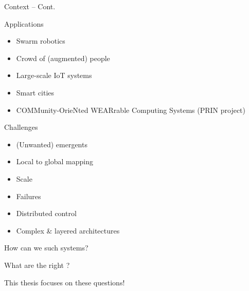 \documentclass[presentation, 9pt,169]{beamer}\mode<presentation>{\usetheme{AMSBolognaFC}}
\begin{document}
\begin{frame}{Context -- Cont.}
\begin{alertblock}{Applications}
  \begin{multicols}{3}
    \begin{itemize}
      \item Swarm robotics
      \item Crowd of (augmented) people
      \item Large-scale IoT systems
      \item Smart cities
      \item COMMunity-OrieNted WEARrable Computing Systems (PRIN project)
    \end{itemize}
  \end{multicols}
\end{alertblock}

\begin{block}{Challenges}
  \begin{multicols}{3}
    \begin{itemize}
      \item (Unwanted) emergents
      \item Local to global mapping
      \item Scale
      \item Failures
      \item Distributed control
      \item Complex \& layered architectures
    \end{itemize}
  \end{multicols}
\end{block}
\begin{center}
  \Large{How can we  such systems?}
  \end{center}
  \begin{center}
    \Large{What are the right ?}
  \end{center}
  \begin{center}
    \Large{This thesis focuses on these questions!}
  \end{center}
\centering
\end{frame}
\end{document}
